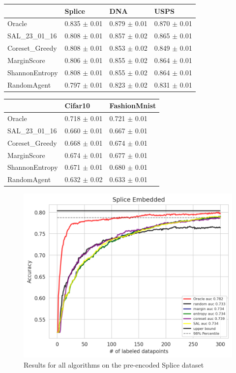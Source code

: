 \documentclass[]{article}
\begin{document}
\begin{table}[]
	\begin{tabular}{l|lll}
		& Splice        & DNA           & USPS          \\
		\hline
		Oracle          & 0.835 $\pm$ 0.01 & 0.879 $\pm$ 0.01 & 0.870 $\pm$ 0.01 \\
		SAL\_23\_01\_16 & 0.808 $\pm$ 0.01 & 0.857 $\pm$ 0.02 & 0.865 $\pm$ 0.01 \\
		Coreset\_Greedy & 0.808 $\pm$ 0.01 & 0.853 $\pm$ 0.02 & 0.849 $\pm$ 0.01 \\
		MarginScore     & 0.806 $\pm$ 0.01 & 0.855 $\pm$ 0.02 & 0.864 $\pm$ 0.01 \\
		ShannonEntropy  & 0.808 $\pm$ 0.01 & 0.855 $\pm$ 0.02 & 0.864 $\pm$ 0.01 \\
		RandomAgent     & 0.797 $\pm$ 0.01 & 0.823 $\pm$ 0.02 & 0.831 $\pm$ 0.01
	\end{tabular}
\end{table}
%
\begin{table}[]
	\begin{tabular}{l|ll}
		& Cifar10 & FashionMnist \\
		\hline
		Oracle          & 0.718 $\pm$ 0.01  & 0.721 $\pm$ 0.01       \\
		SAL\_23\_01\_16 & 0.660 $\pm$ 0.01  & 0.667 $\pm$ 0.01       \\
		Coreset\_Greedy & 0.668 $\pm$ 0.01  & 0.674 $\pm$ 0.01       \\
		MarginScore     & 0.674 $\pm$ 0.01  & 0.677 $\pm$ 0.01       \\
		ShannonEntropy  & 0.671 $\pm$ 0.01  & 0.680 $\pm$ 0.01       \\
		RandomAgent     & 0.632 $\pm$ 0.02  & 0.633 $\pm$ 0.01      
	\end{tabular}
\end{table}
%
\begin{figure}[H]
	\centering
	\includegraphics[width=0.8\linewidth]{img/eval_splice_embedded}
	\caption{Results for all algorithms on the pre-encoded Splice dataset}
\end{figure}
\end{document}
